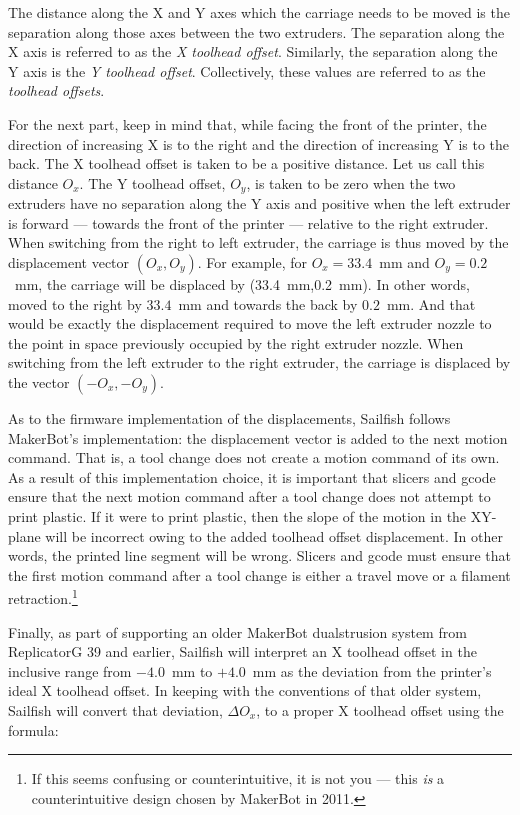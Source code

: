 The distance along the X and Y axes which the carriage needs to be moved is the separation along those axes between the two extruders.  The separation along the X axis is referred to as the \emph{X toolhead offset}.  Similarly, the separation along the Y axis is the \emph{Y toolhead offset}.  Collectively, these values are referred to as the \emph{\glspl{toolhead offset}}.

For the next part, keep in mind that, while facing the front of the printer, the direction of increasing X is to the right and the direction of increasing Y is to the back.  The X toolhead offset is taken to be a positive distance.  Let us call this distance $O_x$.  The Y toolhead offset, $O_y$, is taken to be zero when the two extruders have no separation along the Y axis and positive when the left extruder is forward --- towards the front of the printer --- relative to the right extruder.  When switching from the right to left extruder, the carriage is thus moved by the displacement vector $(O_x, O_y)$.  For example, for $O_x=33.4$~mm and $O_y=0.2$~mm, the carriage will be displaced by (33.4~mm,0.2~mm).  In other words, moved to the right by $33.4$~mm and towards the back by $0.2$~mm.  And that would be exactly the displacement required to move the left extruder nozzle to the point in space previously occupied by the right extruder nozzle. When switching from the left extruder to the right extruder, the carriage is displaced by the vector $(-O_x,-O_y)$.

As to the firmware implementation of the displacements, Sailfish follows MakerBot's implementation: the displacement vector is added to the next motion command.  That is, a tool change does not create a motion command of its own.  As a result of this implementation choice, it is important that slicers and gcode ensure that the next motion command after a tool change does not attempt to print plastic.  If it were to print plastic, then the slope of the motion in the XY-plane will be incorrect owing to the added toolhead offset displacement.  In other words, the printed line segment will be wrong.  Slicers and gcode must ensure that the first motion command after a tool change is either a \gls{travel move} or a filament retraction.\footnote{If this seems confusing or counterintuitive, it is not you --- this \emph{is} a counterintuitive design chosen by MakerBot in 2011.}

Finally, as part of supporting an older MakerBot \gls{dualstrusion} system from ReplicatorG 39 and earlier, Sailfish will interpret an X toolhead offset in the inclusive range from $-4.0$~mm to $+4.0$~mm as the deviation from the printer's ideal X toolhead offset.  In keeping with the conventions of that older system, Sailfish will convert that deviation, $\Delta O_x$, to a proper X toolhead offset using the formula:

